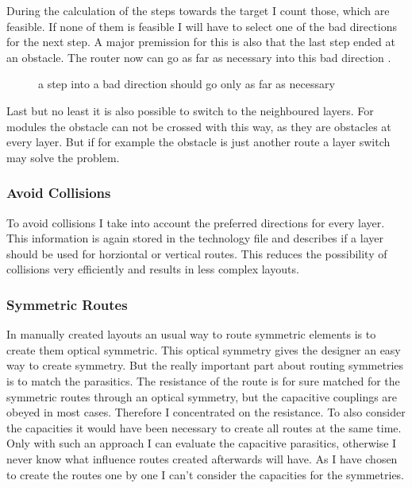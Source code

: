 During the calculation of the steps towards the target I count those, which are feasible. If none of them is feasible I will have to select one of the bad directions for the next step. A major premission for this is also that the last step ended at an obstacle. The router now can go as far as necessary into this bad direction .

\begin{figure}
	\centering
	
 	\caption{a step into a bad direction should go only as far as necessary}
	\label{fig:router_as_far_as_necessary}
\end{figure}

Last but no least it is also possible to switch to the neighboured layers. For modules the obstacle can not be crossed with this way, as they are obstacles at every layer. But if for example the obstacle is just another route a layer switch may solve the problem.

\subsubsection{Avoid Collisions}
To avoid collisions I take into account the preferred directions for every layer. This information is again stored in the technology file and describes if a layer should be used for horziontal or vertical routes. This reduces the possibility of collisions very efficiently and results in less complex layouts.

\subsubsection{Symmetric Routes}
In manually created layouts an usual way to route symmetric elements is to create them optical symmetric. This optical symmetry gives the designer an easy way to create symmetry. But the really important part about routing symmetries is to match the parasitics. The resistance of the route is for sure matched for the symmetric routes through an optical symmetry, but the capacitive couplings are obeyed in most cases. Therefore I concentrated on the resistance. To also consider the capacities it would have been necessary to create all routes at the same time. Only with such an approach I can evaluate the capacitive parasitics, otherwise I never know what influence routes created afterwards will have. As I have chosen to create the routes one by one I can't consider the capacities for the symmetries.

